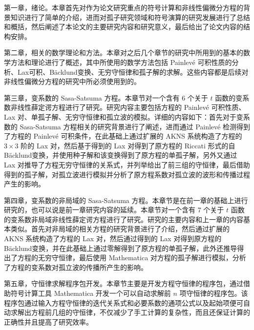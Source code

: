 第一章，绪论。本章首先对作为论文研究重点的符号计算和非线性偏微分方程的背景知识进行了简单的介绍，进而对孤子研究领域和符号演算的研究发展进行了总结和概括，然后阐述了本论文的主要研究内容和研究意义，最后给出了论文内容的结构安排。

第二章，相关的数学理论和方法。本章对之后几个章节的研究中所用到的基本的数学方法和理论进行了概述，其中所使用的数学方法包括 Painlev\'{e} 可积性质的分析、Lax可积、B\"{a}cklund变换、无穷守恒律和孤子解的求解。这些内容都是后续对非线性偏微分方程的研究中所必须使用到的。

第三章，变系数的 Sasa-Satsuma 方程。本章节对一个含有 6 个关于 $t$ 函数的变系数非线性薛定谔方程进行了研究。研究内容主要包括方程的 Painlev\'{e} 可积性质、Lax 对、单孤子解、无穷守恒律和孤立波的模拟。详细的内容如下：首先对于变系数的 Sasa-Satsuma 方程相关的研究背景进行了阐述，进而通过  Painlev\'{e} 检测得到了方程的  Painlev\'{e} 可积条件，在此基础上通过扩展的 AKNS 系统构造了方程的 $3 \times 3$ 阶的 Lax 对，然后基于得到的 Lax 对得到了原方程的 Riccati 形式的自 B\"{a}cklund变换，并使用种子解和该变换得到了原方程的单孤子解，另外又通过 Lax 对推导了方程无穷守恒律的关系式，并列举给出了前三组的守恒律，最后借助得到的孤子解，对孤立波进行模拟并分析了原方程系数对孤立波的波形和传播过程产生的影响。

第四章，变系数的非局域的 Sasa-Satsuma 方程。本章节是在前一章的基础上进行研究的，也可以说是前一章研究内容的延续。本章节对一个含有 7 个关于 $t$ 函数的变系数非局域非线性薛定谔方程进行了研究。研究的主要内容和上一章的内容基本类似。首先对非局域的相关方程的研究背景进行了介绍，然后通过扩展的 AKNS 系统构造了方程的 Lax 对，然后通过得到的 Lax 对得到原方程的 B\"{a}cklund变换，并在此基础上通过零解得到了原方程的单孤子解，此外还推导得出了方程的无穷守恒律，最后使用 Mathematica 对方程的孤子解进行模拟，分析了方程的变系数对孤立波的传播所产生的影响。

第五章，守恒律求解程序包开发。本章节主要是开发方程守恒律的程序包，通过借助符号计算工具 Mathematica 开发一个可以自动求解前 $n$ 项守恒律的程序包。该程序包通过输入方程守恒律的迭代关系式和必要系数的通项公式以及起始项便可自动求解出方程前几组的守恒律，不仅减少了手工计算的复杂性，而且还保证计算的正确性并且提高了研究效率。












